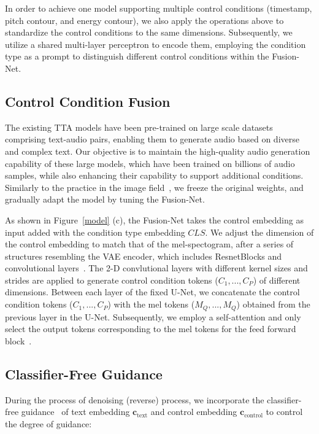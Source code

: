 \documentclass[letterpaper]{article} %
\begin{document}
In order to achieve one model supporting multiple control conditions (timestamp, pitch contour, and energy contour), we also apply the operations above to standardize the control conditions to the same dimensions. Subsequently, we utilize a shared multi-layer perceptron to encode them, employing the condition type as a prompt to distinguish different control conditions within the Fusion-Net.

\subsection{Control Condition Fusion}
\label{control condition fusion}

The existing TTA models have been pre-trained on large scale datasets comprising text-audio pairs, enabling them to generate audio based on diverse and complex text. Our objective is to maintain the high-quality audio generation capability of these large models, which have been trained on billions of audio samples, while also enhancing their capability to support additional conditions. Similarly to the practice in the image field~\cite{zhang2023adding,li2023gligen}, we freeze the original weights, and gradually adapt the model by tuning the Fusion-Net.

As shown in Figure~\ref{model} (c), the Fusion-Net takes the control embedding as input added with the condition type embedding $CLS$. We adjust the dimension of the control embedding to match that of the mel-spectogram, after a series of structures resembling the VAE encoder, which includes ResnetBlocks and convolutional layers~\cite{kingma2013vae}. The 2-D convlutional layers with different kernel sizes and strides are applied to generate control condition tokens ($C_1, ..., C_P$) of different dimensions. Between each layer of the fixed U-Net, we concatenate the control condition tokens ($C_1, ..., C_P$) with the mel tokens ($M_Q, ..., M_Q$) obtained from the previous layer in the U-Net. Subsequently, we employ a self-attention and only select the output tokens corresponding to the mel tokens for the feed forward block~\cite{li2023gligen}.

\subsection{Classifier-Free Guidance}

During the process of denoising (reverse) process, we incorporate the classifier-free guidance~\cite{jonathan2022classfree} of text embedding $\mathbf{c}_{\text{text}}$ and control embedding $\mathbf{c}_{\text{control}}$ to control the degree of guidance:
\end{document}
